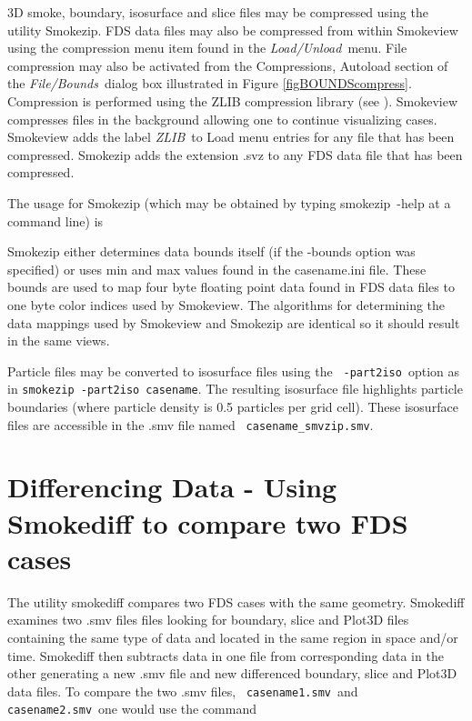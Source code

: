 \documentclass[11pt,twoside]{book}
\begin{document}
3D smoke, boundary, isosurface and slice files may be compressed
using the utility Smokezip.  FDS data files may also be compressed
from within Smokeview using the compression menu item found in the
{\em Load/Unload}\ menu.  File compression may also be activated
from the Compressions, Autoload section of the {\em File/Bounds}\
dialog box illustrated in Figure \ref{figBOUNDScompress}.
Compression is performed using the ZLIB compression library (see
\hhref{http://www.zlib.org}). Smokeview compresses files in the
background allowing one to continue visualizing cases.  Smokeview
adds the label {\em ZLIB}\ to Load menu entries for any file that
has been compressed. Smokezip adds the extension .svz to any FDS
data file that has been compressed.

The usage for Smokezip (which may be obtained by typing smokezip~-help at a command line) is



Smokezip either determines data bounds itself (if the -bounds option was specified)
or uses min and max values found in the casename.ini
file.  These bounds are used to map four byte floating point data
found in FDS data files to one byte color indices used by
Smokeview.  The algorithms for determining
the data mappings used by Smokeview and Smokezip are identical so it
should result in the same views.

Particle files may be converted to isosurface files using the {\tt
-part2iso}\ option as in {\tt smokezip -part2iso casename}.  The
resulting isosurface file highlights particle boundaries (where
particle density is 0.5 particles per grid cell). These isosurface
files are accessible in the .smv file named {\tt
casename\_smvzip.smv}.

\section{Differencing Data - Using Smokediff to compare two FDS cases}
\label{ch:smokediff}
The utility smokediff compares two FDS cases with the same
geometry.  Smokediff examines two .smv files files looking for
boundary, slice and Plot3D files containing the same type of data
and located in the same region in space and/or time. Smokediff
then subtracts data in one file from corresponding data in the
other generating a new .smv file and new differenced boundary,
slice and Plot3D data files. To compare the two .smv files, {\tt
casename1.smv}\ and {\tt casename2.smv}\ one would use the command
\end{document}
